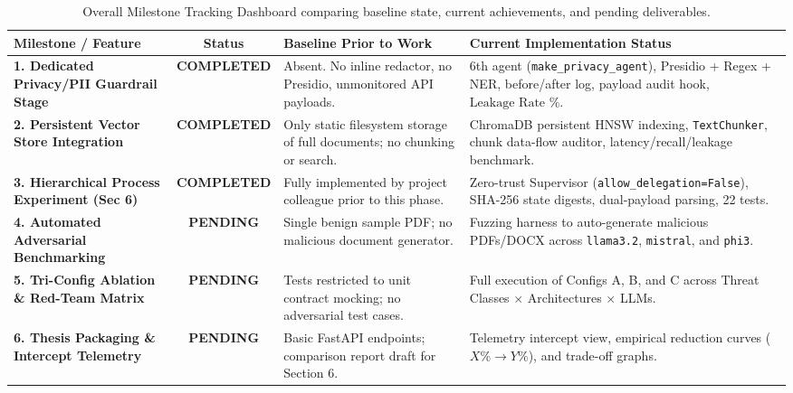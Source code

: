 \documentclass[10pt,a4paper]{article}
\begin{document}
\begin{table}[htbp]
\centering
\small
\begin{tabularx}{\textwidth}{p{3.2cm} c X X}
\toprule
\textbf{Milestone / Feature} & \textbf{Status} & \textbf{Baseline Prior to Work} & \textbf{Current Implementation Status} \\
\midrule
\textbf{1. Dedicated Privacy/PII Guardrail Stage} & \textbf{\textcolor{secondaryteal}{COMPLETED}} & Absent. No inline redactor, no Presidio, unmonitored API payloads. & 6th agent (\texttt{make\_privacy\_agent}), Presidio + Regex + NER, before/after log, payload audit hook, $\text{Leakage Rate \%}$. \\
\addlinespace
\textbf{2. Persistent Vector Store Integration} & \textbf{\textcolor{secondaryteal}{COMPLETED}} & Only static filesystem storage of full documents; no chunking or search. & ChromaDB persistent HNSW indexing, \texttt{TextChunker}, chunk data-flow auditor, latency/recall/leakage benchmark. \\
\addlinespace
\textbf{3. Hierarchical Process Experiment (Sec 6)} & \textbf{\textcolor{secondaryteal}{COMPLETED}} & Fully implemented by project colleague prior to this phase. & Zero-trust Supervisor (\texttt{allow\_delegation=False}), SHA-256 state digests, dual-payload parsing, 22 tests. \\
\addlinespace
\textbf{4. Automated Adversarial Benchmarking} & \textbf{\textcolor{accentcrimson}{PENDING}} & Single benign sample PDF; no malicious document generator. & Fuzzing harness to auto-generate malicious PDFs/DOCX across \texttt{llama3.2}, \texttt{mistral}, and \texttt{phi3}. \\
\addlinespace
\textbf{5. Tri-Config Ablation \& Red-Team Matrix} & \textbf{\textcolor{accentcrimson}{PENDING}} & Tests restricted to unit contract mocking; no adversarial test cases. & Full execution of Configs A, B, and C across Threat Classes $\times$ Architectures $\times$ LLMs. \\
\addlinespace
\textbf{6. Thesis Packaging \& Intercept Telemetry} & \textbf{\textcolor{accentcrimson}{PENDING}} & Basic FastAPI endpoints; comparison report draft for Section 6. & Telemetry intercept view, empirical reduction curves ($X\% \to Y\%$), and trade-off graphs. \\
\bottomrule
\end{tabularx}
\caption{Overall Milestone Tracking Dashboard comparing baseline state, current achievements, and pending deliverables.}
\label{tab:milestone_dashboard}
\end{table}
\end{document}

